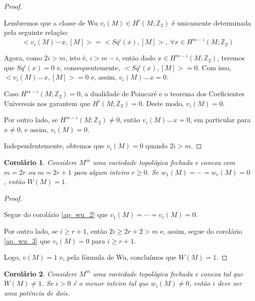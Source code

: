\documentclass[12pt,oneside]{book} %
\newtheorem{cor}    {\hspace{0.5cm}Corol\'ario}[chapter]
\newcommand{\Z}{\mathbb{Z}}
\newcommand{\ccup}{\smile}
\begin{document}
\begin{proof}
	
	\
	
	\par Lembremos que a classe de Wu $v_{i}(M)\in H^{i}(M;\Z_{2})$ é unicamente determinada pela seguinte relação:
	$$ <v_{i}(M)\ccup x,[M]>=<Sq^{i}(x),[M]>, \ \forall x\in H^{m-i}(M;\Z_{2}) $$
	
	\par Agora, como $2i>m$, isto é, $i>m-i$, então dado $x\in H^{m-i}(M;\Z_{2})$, teremos que $Sq^{i}(x)=0$ e, consequentemente, $<Sq^{i}(x),[M]>=0$. Com isso, $<v_{i}(M)\ccup x,[M]>=0$ e, assim, $v_{i}(M)\ccup x=0$.
	
	\par Caso $H^{m-i}(M;\Z_{2})=0$, a dualidade de Poincaré e o teorema dos Coeficientes Universais nos garantem que $H^{i}(M;\Z_{2})=0$. Deste modo, $v_{i}(M)=0$.
	
	\par Por outro lado, se $H^{m-i}(M;\Z_{2})\neq 0$, então $v_{i}(M)\ccup x=0$, em particular para $x\neq 0$, e assim, $v_{i}(M)=0$.
	
	\par Independentemente, obtemos que $v_{i}(M)=0$ quando $2i>m$.
	
\end{proof}

\begin{cor}\label{ap_wu_4}
	Considere $M^{m}$ uma variedade topológica fechada e conexa com $m=2r$ ou $m=2r+1$ para algum inteiro $r\geq 0$. Se $w_{1}(M)=\cdots=w_{r}(M)=0$, então $W(M)=1$.
\end{cor}

\begin{proof}
	
	\
	
	\par Segue do corolário \ref{ap_wu_2} que $v_{1}(M)=\cdots=v_{r}(M)=0$.
	
	\par Por outro lado, se $i\geq r+1$, então $2i\geq 2r+2>m$ e, assim, segue do corolário \ref{ap_wu_3} que $v_{i}(M)=0$ para $i\geq r+1$.
	
	\par Logo, $v(M)=1$ e, pela fórmula de Wu, concluímos que $W(M)=1$.
	
\end{proof}

\begin{cor}\label{ap_wu_5}
	Considere $M^{m}$ uma variedade topológica fechada e conexa tal que $W(M)\neq 1$. Se $i>0$ é o menor inteiro tal que $w_{i}(M)\neq 0$, então $i$ deve ser uma potência de dois.
\end{cor}
\end{document}
